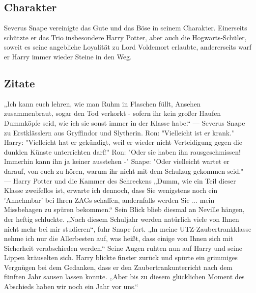 \documentclass[a4paper, 10pt]{article}
\begin{document}
\subsection*{\Large Charakter}
Severus Snape vereinigte das Gute und das Böse in seinem Charakter. Einerseits schützte er das Trio insbesondere Harry Potter, aber auch die Hogwarts-Schüler, soweit es seine angebliche Loyalität zu Lord Voldemort erlaubte, andererseits warf er Harry immer wieder Steine in den Weg.

\subsection*{\Large Zitate}
„Ich kann euch lehren, wie man Ruhm in Flaschen füllt, Ansehen zusammenbraut, sogar den Tod verkorkt - sofern ihr kein großer Haufen Dummköpfe seid, wie ich sie sonst immer in der Klasse habe.“
\vspace{10pt}
\newline
— Severus Snape zu Erstklässlern aus Gryffindor und Slytherin.
\vspace{10pt}
\newline
Ron: "Vielleicht ist er krank."
\vspace{10pt}
\newline
Harry: "Vielleicht hat er gekündigt, weil er wieder nicht Verteidigung gegen die dunklen Künste unterrichten darf!"
\vspace{10pt}
\newline
Ron: "Oder sie haben ihn rausgeschmissen! Immerhin kann ihn ja keiner ausstehen -"
\vspace{10pt}
\newline
Snape: "Oder vielleicht wartet er darauf, von euch zu hören, warum ihr nicht mit dem Schulzug gekommen seid."
\vspace{10pt}
\newline
— Harry Potter und die Kammer des Schreckens
\vspace{10pt}
\newline
„Dumm, wie ein Teil dieser Klasse zweifellos ist, erwarte ich dennoch, dass Sie wenigstens noch ein 'Annehmbar' bei Ihren ZAGs schaffen, andernfalls werden Sie ... mein Missbehagen zu spüren bekommen.“ Sein Blick blieb diesmal an Neville hängen, der heftig schluckte. „Nach diesem Schuljahr werden natürlich viele von Ihnen nicht mehr bei mir studieren“, fuhr Snape fort. „In meine UTZ-Zaubertrankklasse nehme ich nur die Allerbesten auf, was heißt, dass einige von Ihnen sich mit Sicherheit verabschieden werden.“ Seine Augen ruhten nun auf Harry und seine Lippen kräuselten sich. Harry blickte finster zurück und spürte ein grimmiges Vergnügen bei dem Gedanken, dass er den Zaubertrankunterricht nach dem fünften Jahr sausen lassen konnte. „Aber bis zu diesem glücklichen Moment des Abschieds haben wir noch ein Jahr vor uns.“
\end{document}
